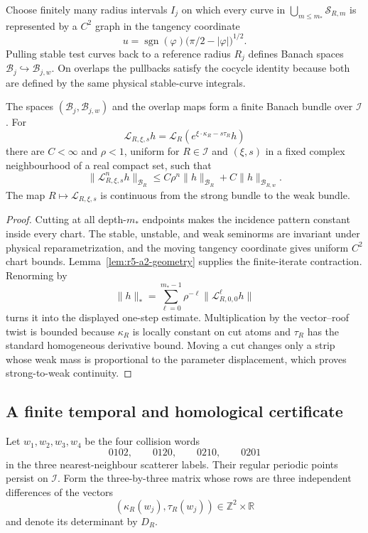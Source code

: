 Choose finitely many radius intervals \(I_j\) on which every curve in
\(\bigcup_{m\le m_*}{\mathcal S}_{R,m}\) is represented by a \(C^2\) graph
in the tangency coordinate
\[
 u=\operatorname{sgn}(\varphi)
   \bigl(\pi/2-|\varphi|\bigr)^{1/2}.
\]
Pulling stable test curves back to a reference radius \(R_j\) defines Banach
spaces \({\mathcal B}_j\hookrightarrow{\mathcal B}_{j,w}\).  On overlaps the
pullbacks satisfy the cocycle identity because both are defined by the same
physical stable-curve integrals.

\begin{proposition}
\label{prop:r5-a2-bundle}
The spaces \((\mathcal B_j,\mathcal B_{j,w})\) and the overlap maps form a
finite Banach bundle over \({\mathcal I}\).  For
\[
 {\mathcal L}_{R,\xi,s}h
 ={\mathcal L}_R\!\left(e^{\xi\cdot\kappa_R-s\tau_R}h\right)
\]
there are \(C<\infty\) and \(\rho<1\), uniform for \(R\in{\mathcal I}\) and
\((\xi,s)\) in a fixed complex neighbourhood of a real compact set, such that
\[
 \|{\mathcal L}_{R,\xi,s}^nh\|_{{\mathcal B}_R}
 \le C\rho^n\|h\|_{{\mathcal B}_R}
      +C\|h\|_{{\mathcal B}_{R,w}}.
\]
The map \(R\mapsto{\mathcal L}_{R,\xi,s}\) is continuous from the strong
bundle to the weak bundle.
\end{proposition}

\begin{proof}
Cutting at all depth-\(m_*\) endpoints makes the incidence pattern constant
inside every chart.  The stable, unstable, and weak seminorms are invariant
under physical reparametrization, and the moving tangency coordinate gives
uniform \(C^2\) chart bounds.  Lemma~\ref{lem:r5-a2-geometry} supplies the
finite-iterate contraction.  Renorming by
\[
 \|h\|_*=
 \sum_{\ell=0}^{m_*-1}\rho^{-\ell}
              \|{\mathcal L}_{R,0,0}^\ell h\|
\]
turns it into the displayed one-step estimate.  Multiplication by the
vector--roof twist is bounded because \(\kappa_R\) is locally constant on cut
atoms and \(\tau_R\) has the standard homogeneous derivative bound.
Moving a cut changes only a strip whose weak mass is proportional to the
parameter displacement, which proves strong-to-weak continuity.
\end{proof}

\subsection{A finite temporal and homological certificate}

Let \(w_1,w_2,w_3,w_4\) be the four collision words
\[
 0102,\qquad 0120,\qquad 0210,\qquad 0201
\]
in the three nearest-neighbour scatterer labels.  Their regular periodic
points persist on \({\mathcal I}\).  Form the three-by-three matrix whose rows
are three independent differences of the vectors
\[
 (\kappa_R(w_j),\tau_R(w_j))\in\mathbb Z^2\times\mathbb R
\]
and denote its determinant by \(D_R\).

